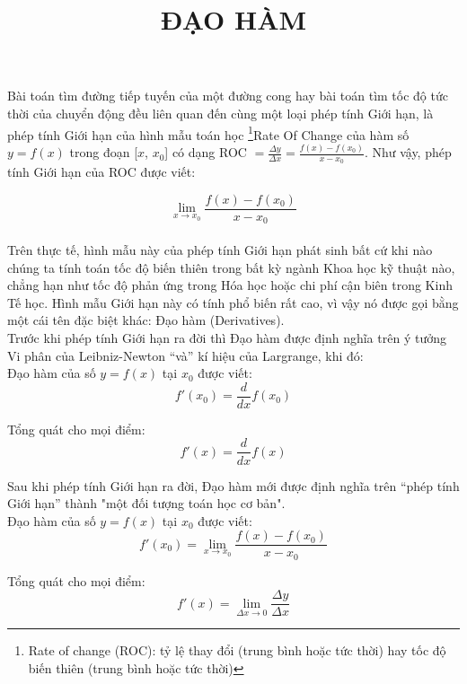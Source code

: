 \documentclass[a4paper,10pt]{article}
\title{\vspace{-8ex} \bfseries ĐẠO HÀM}
\date{\vspace{-8ex}}
\begin{document}
\maketitle
Bài toán tìm đường tiếp tuyến của một đường cong hay bài toán tìm tốc độ tức thời của chuyển động đều liên quan đến cùng một loại phép tính Giới hạn, là phép tính Giới hạn của hình mẫu toán học \footnote{Rate of change (ROC): tỷ lệ thay đổi (trung bình hoặc tức thời) hay tốc độ biến thiên (trung bình hoặc tức thời)}Rate Of Change của hàm số $y=f(x)$ trong đoạn [$x$, $x_0$] có dạng ROC $= \frac{\Delta y}{\Delta x}=\frac{f(x)-f(x_0)}{x-x_0}$. Như vậy, phép tính Giới hạn của ROC được viết:


$$ \lim_{x \to x_0} \frac{f(x)-f(x_0)}{x-x_0} $$\\

Trên thực tế, hình mẫu này của phép tính Giới hạn phát sinh bất cứ khi nào chúng ta tính toán tốc độ biến thiên trong bất kỳ ngành Khoa học kỹ thuật nào, chẳng hạn như tốc độ phản ứng trong Hóa học hoặc chi phí cận biên trong Kinh Tế học. Hình mẫu Giới hạn này có tính phổ biến rất cao, vì vậy nó được gọi bằng một cái tên đặc biệt khác: Đạo hàm (Derivatives).\\

Trước khi phép tính Giới hạn ra đời thì Đạo hàm được định nghĩa trên ý tưởng Vi phân của Leibniz-Newton “và” kí hiệu của Largrange, khi đó:\\

Đạo hàm của số $y=f(x)$ tại $x_0$ được viết: $$f'(x_0)=\frac{d}{dx}f(x_0)$$

Tổng quát cho mọi điểm: $$f'(x)=\frac{d}{dx}f(x)$$

Sau khi phép tính Giới hạn ra đời, Đạo hàm mới được định nghĩa trên “phép tính Giới hạn” thành "một đối tượng toán học cơ bản".\\

Đạo hàm của số $y=f(x)$ tại $x_0$ được viết:
$$f'(x_0)=\lim_{x \to x_0} \frac{f(x)-f(x_0)}{x-x_0}$$

Tổng quát cho mọi điểm: $$ f'(x)=\lim_{\Delta x \to 0}\frac{\Delta y}{\Delta x} $$
\end{document}
